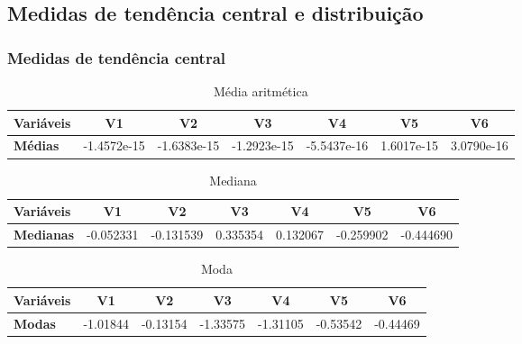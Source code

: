 \subsection[Subsection]{Medidas de tendência central e distribuição}
\begin{frame}[shrink=30]
    \frametitle{Medidas de tendência central}

    \vspace{3em}

    \begin{table}
        \begin{tabular}{ l | c | c | c | c | c | c }
            \textbf{Variáveis} & V1 & V2 & V3 & V4 & V5 & V6 \\ \hline \hline 
            \textbf{Médias} & -1.4572e-15 & -1.6383e-15 & -1.2923e-15 & -5.5437e-16 & 1.6017e-15 & 3.0790e-16 \\  
        \end{tabular}
        \caption{Média aritmética}
    \end{table}

    \begin{table}
        \begin{tabular}{ l | c | c | c | c | c | c }
            \textbf{Variáveis} & V1 & V2 & V3 & V4 & V5 & V6 \\ \hline \hline 
            \textbf{Medianas}  & -0.052331 & -0.131539 & 0.335354 & 0.132067 & -0.259902 & -0.444690 \\  
        \end{tabular}
        \caption{Mediana}
    \end{table}

    \begin{table}
        \begin{tabular}{ l | c | c | c | c | c | c }
            \textbf{Variáveis} & V1 & V2 & V3 & V4 & V5 & V6 \\ \hline \hline 
            \textbf{Modas}     & -1.01844 & -0.13154 & -1.33575 & -1.31105 & -0.53542 & -0.44469 \\  
        \end{tabular}
        \caption{Moda}
    \end{table}

\end{frame}

